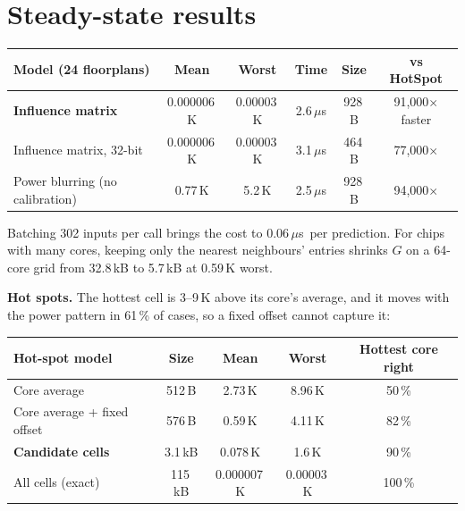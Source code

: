 \documentclass[11pt,a4paper]{article}
\newcommand{\us}{\,$\mu$s}
\begin{document}
\section{Steady-state results}
\begin{center}
\small
\begin{tabular}{@{}l c c c c c@{}}
\toprule
Model (24 floorplans) & Mean & Worst & Time & Size & vs HotSpot \\
\midrule
\textbf{Influence matrix} & 0.000006\,K & 0.00003\,K & 2.6\us & 928\,B & 91{,}000$\times$ faster \\
Influence matrix, 32-bit & 0.000006\,K & 0.00003\,K & 3.1\us & 464\,B & 77{,}000$\times$ \\
Power blurring (no calibration) & 0.77\,K & 5.2\,K & 2.5\us & 928\,B & 94{,}000$\times$ \\
\bottomrule
\end{tabular}
\end{center}
Batching 302 inputs per call brings the cost to 0.06\us\ per prediction. For chips with many
cores, keeping only the nearest neighbours' entries shrinks $G$ on a 64-core grid from 32.8\,kB to
5.7\,kB at 0.59\,K worst.

\textbf{Hot spots.} The hottest cell is 3--9\,K above its core's average, and it moves with the
power pattern in 61\,\% of cases, so a fixed offset cannot capture it:
\begin{center}
\small
\begin{tabular}{@{}l c c c c@{}}
\toprule
Hot-spot model & Size & Mean & Worst & Hottest core right \\
\midrule
Core average & 512\,B & 2.73\,K & 8.96\,K & 50\,\% \\
Core average + fixed offset & 576\,B & 0.59\,K & 4.11\,K & 82\,\% \\
\textbf{Candidate cells} & 3.1\,kB & 0.078\,K & 1.6\,K & 90\,\% \\
All cells (exact) & 115\,kB & 0.000007\,K & 0.00003\,K & 100\,\% \\
\bottomrule
\end{tabular}
\end{center}

\end{document}
